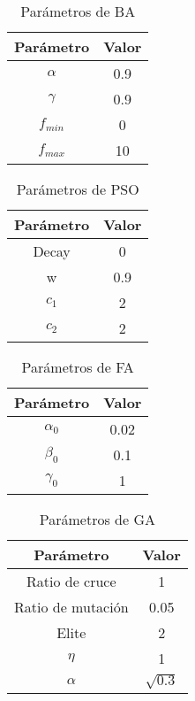 \begin{table}[H]
    \centering
    \begin{tabular}{ c c }
        \hline
        \textbf{Parámetro} & \textbf{Valor} \\
        \hline
        $\alpha$           & 0.9            \\
        $\gamma $          & 0.9            \\
        $f_{min}$          & 0              \\
        $f_{max}$          & 10             \\
        \hline
    \end{tabular}
    \caption{Parámetros de BA}
\end{table}

\begin{table}[H]
    \centering
    \begin{tabular}{ c c }
        \hline
        \textbf{Parámetro} & \textbf{Valor} \\
        \hline
        Decay              & 0              \\
        w                  & 0.9            \\
        $c_1$              & 2              \\
        $c_2$              & 2              \\
        \hline
    \end{tabular}
    \caption{Parámetros de PSO}
\end{table}

\begin{table}[H]
    \centering
    \begin{tabular}{ c c }
        \hline
        \textbf{Parámetro} & \textbf{Valor} \\
        \hline
        $\alpha_0$         & 0.02           \\
        $\beta_0$          & 0.1            \\
        $\gamma_0$         & 1              \\
        \hline
    \end{tabular}
    \caption{Parámetros de FA}
\end{table}

\begin{table}[H]
    \centering
    \begin{tabular}{ c c }
        \hline
        \textbf{Parámetro} & \textbf{Valor} \\
        \hline
        Ratio de cruce     & 1              \\
        Ratio de mutación  & 0.05           \\
        Elite              & 2              \\
        $\eta$             & 1              \\
        $\alpha$           & $\sqrt{0.3}$   \\
        \hline
    \end{tabular}
    \caption{Parámetros de GA}
\end{table}

